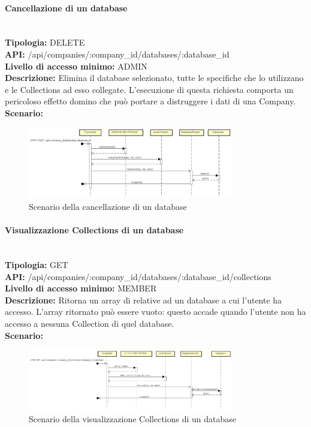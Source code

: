 \paragraph{Cancellazione di un database}\mbox{}\\
\textbf{Tipologia:} DELETE \\
\textbf{API:} /api/companies/:company\_id/databases/:database\_id \\
\textbf{Livello di accesso minimo:} ADMIN \\
\textbf{Descrizione:} Elimina il database selezionato, tutte le specifiche  che lo utilizzano e le Collections ad esso collegate. L'esecuzione di questa richiesta comporta un pericoloso effetto domino che può portare a distruggere i dati di una Company. \\
\textbf{Scenario:} 
\begin{figure}[H]
\centering
\includegraphics[width=0.8\textwidth]{res/sections/backend/sequence/(DELETE)database.png}
\caption{Scenario della cancellazione di un database}
\end{figure}

\newpage
\paragraph{Visualizzazione Collections di un database} \mbox{}\\
\textbf{Tipologia:} GET \\
\textbf{API:} /api/companies/:company\_id/databases/:database\_id/collections \\
\textbf{Livello di accesso minimo:} MEMBER \\
\textbf{Descrizione:} Ritorna un array di  relative ad un database a cui l'utente ha accesso. L'array ritornato può essere vuoto: questo accade quando l'utente non ha accesso a nessuna Collection di quel database. \\
\textbf{Scenario:} 
\begin{figure}[H]
\centering
\includegraphics[width=0.8\textwidth]{res/sections/backend/sequence/(GET)collection.png}
\caption{Scenario della visualizzazione Collections di un database}
\end{figure}

